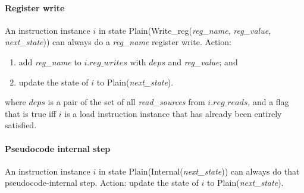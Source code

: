 \paragraph{Register write}\label{omm:reg_write}
An instruction instance $i$ in state {\sc Plain}({\sc Write\_reg}({\it reg\_name}, {\it reg\_value}, {\it next\_state})) can always do a {\it reg\_name} register write.
Action:
\begin{enumerate}
\item add {\it reg\_name} to $i.\textit{reg\_writes}$ with $deps$ and {\it reg\_value}; and
\item update the state of $i$ to {\sc Plain}({\it next\_state}).
\end{enumerate}
where $deps$ is a pair of the set of all {\it read\_sources} from $i.\textit{reg\_reads}$, and a flag that is true iff $i$ is a load instruction instance that has already been entirely satisfied.


\paragraph{Pseudocode internal step}\label{omm:sail_interp}
An instruction instance $i$ in state {\sc Plain}({\sc Internal}({\it next\_state})) can always do that pseudocode-internal step.
Action: update the state of $i$ to {\sc Plain}({\it next\_state}).


